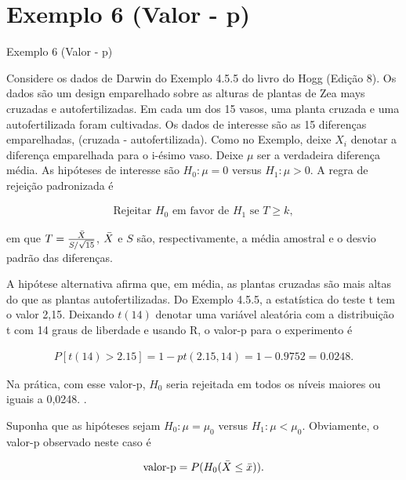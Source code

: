 \documentclass[12pt]{beamer}
\begin{document}
\section{Exemplo 6 (Valor - p)}
\begin{frame}{Exemplo 6 (Valor - p)}
\begin{block}{}
\justifying
Considere os dados de Darwin do Exemplo 4.5.5 do livro do Hogg (Edição 8). Os dados são um design emparelhado sobre as alturas de plantas de Zea mays cruzadas e autofertilizadas. Em cada um dos 15 vasos, uma planta cruzada e uma autofertilizada foram cultivadas. Os dados de interesse são as 15 diferenças emparelhadas, (cruzada - autofertilizada). Como no Exemplo, deixe $X_i$ denotar a diferença emparelhada para o i-ésimo vaso. Deixe $\mu$ ser a verdadeira diferença média. As hipóteses de interesse são $H_0 : \mu = 0$ versus $H_1 : \mu > 0$. A regra de rejeição padronizada é

\begin{align}
\text{Rejeitar } H_0 \text{ em favor de } H_1 \text{ se } T \geq k,
\end{align}

em que $T = \frac{\Bar{X}}{S/\sqrt{15}}$, $\Bar{X}$ e $S$ são, respectivamente, a média amostral e o desvio padrão das diferenças. 
\end{block}
\end{frame}

\begin{frame}{}
\begin{block}{}
\justifying
A hipótese alternativa afirma que, em média, as plantas cruzadas são mais altas do que as plantas autofertilizadas. Do Exemplo 4.5.5, a estatística do teste t tem o valor 2,15. Deixando $t(14)$ denotar uma variável aleatória com a distribuição t com 14 graus de liberdade e usando R, o valor-p para o experimento é

\begin{align*}
P[t(14) > 2.15] = 1 - pt(2.15, 14) = 1 - 0.9752 = 0.0248. 
\end{align*}

Na prática, com esse valor-p, $H_0$ seria rejeitada em todos os níveis maiores ou iguais a 0,0248. .

Suponha que as hipóteses sejam $H_0 : \mu = \mu_0$ versus $H_1 : \mu < \mu_0$. Obviamente, o valor-p observado neste caso é

\begin{align*}
\text{valor-p} = P(H_0 (\Bar{X} \leq \Bar{x})).
\end{align*}
\end{block}
\end{frame}
\end{document}
